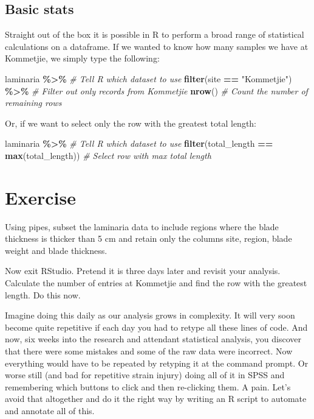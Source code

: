 \documentclass[
]{book}
\newenvironment{Shaded}{\begin{snugshade}}{\end{snugshade}}
\newcommand{\CommentTok}[1]{\textcolor[rgb]{0.56,0.35,0.01}{\textit{#1}}}
\newcommand{\KeywordTok}[1]{\textcolor[rgb]{0.13,0.29,0.53}{\textbf{#1}}}
\newcommand{\NormalTok}[1]{#1}
\newcommand{\OperatorTok}[1]{\textcolor[rgb]{0.81,0.36,0.00}{\textbf{#1}}}
\newcommand{\StringTok}[1]{\textcolor[rgb]{0.31,0.60,0.02}{#1}}
\begin{document}
\hypertarget{basic-stats}{%
\subsection{Basic stats}\label{basic-stats}}

Straight out of the box it is possible in R to perform a broad range of statistical calculations on a dataframe. If we wanted to know how many samples we have at Kommetjie, we simply type the following:

\begin{Shaded}
\begin{Highlighting}[]
\NormalTok{laminaria }\OperatorTok{\%>\%}\StringTok{ }\CommentTok{\# Tell R which dataset to use}
\StringTok{  }\KeywordTok{filter}\NormalTok{(site }\OperatorTok{==}\StringTok{ "Kommetjie"}\NormalTok{) }\OperatorTok{\%>\%}\StringTok{ }\CommentTok{\# Filter out only records from Kommetjie}
\StringTok{  }\KeywordTok{nrow}\NormalTok{() }\CommentTok{\# Count the number of remaining rows}
\end{Highlighting}
\end{Shaded}

Or, if we want to select only the row with the greatest total length:

\begin{Shaded}
\begin{Highlighting}[]
\NormalTok{laminaria }\OperatorTok{\%>\%}\StringTok{ }\CommentTok{\# Tell R which dataset to use}
\StringTok{  }\KeywordTok{filter}\NormalTok{(total\_length }\OperatorTok{==}\StringTok{ }\KeywordTok{max}\NormalTok{(total\_length)) }\CommentTok{\# Select row with max total length}
\end{Highlighting}
\end{Shaded}

\hypertarget{exercise-1}{%
\section{Exercise}\label{exercise-1}}

Using pipes, subset the laminaria data to include regions where the blade thickness is thicker than 5 cm and retain only the columns site, region, blade weight and blade thickness.

Now exit RStudio. Pretend it is three days later and revisit your analysis. Calculate the number of entries at Kommetjie and find the row with the greatest length. Do this now.

Imagine doing this daily as our analysis grows in complexity. It will very soon become quite repetitive if each day you had to retype all these lines of code. And now, six weeks into the research and attendant statistical analysis, you discover that there were some mistakes and some of the raw data were incorrect. Now everything would have to be repeated by retyping it at the command prompt. Or worse still (and bad for repetitive strain injury) doing all of it in SPSS and remembering which buttons to click and then re-clicking them. A pain. Let's avoid that altogether and do it the right way by writing an R script to automate and annotate all of this.
\end{document}
